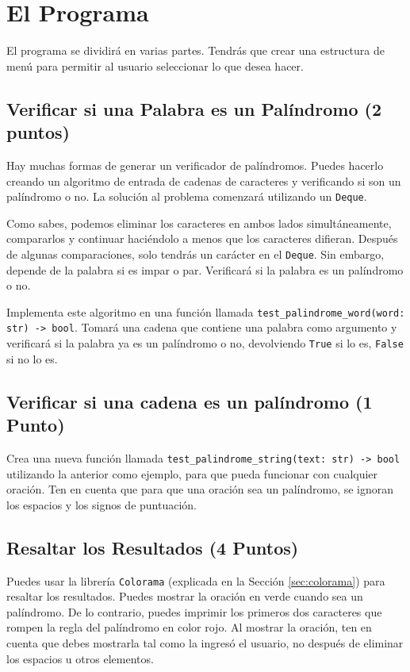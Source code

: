 \documentclass[10pt,a4paper]{article}
\begin{document}
\section{El Programa}

El programa se dividirá en varias partes. Tendrás que crear una estructura de menú para permitir al usuario seleccionar lo que desea hacer.


\subsection{Verificar si una Palabra es un Palíndromo (2 puntos)}

Hay muchas formas de generar un verificador de palíndromos. Puedes hacerlo creando un algoritmo de entrada de cadenas de caracteres y verificando si son un palíndromo o no. La solución al problema comenzará utilizando un \texttt{Deque}.

Como sabes, podemos eliminar los caracteres en ambos lados simultáneamente, compararlos y continuar haciéndolo a menos que los caracteres difieran. Después de algunas comparaciones, solo tendrás un carácter en el \texttt{Deque}. Sin embargo, depende de la palabra si es impar o par. Verificará si la palabra es un palíndromo o no.

Implementa este algoritmo en una función llamada \lstinline|test_palindrome_word(word: str) -> bool|. Tomará una cadena que contiene una palabra como argumento y verificará si la palabra ya es un palíndromo o no, devolviendo \lstinline|True| si lo es, \lstinline|False| si no lo es.

\subsection{Verificar si una cadena es un palíndromo (1 Punto)}
Crea una nueva función llamada \lstinline|test_palindrome_string(text: str) -> bool| utilizando la anterior como ejemplo, para que pueda funcionar con cualquier oración. Ten en cuenta que para que una oración sea un palíndromo, se ignoran los espacios y los signos de puntuación.

\subsection{Resaltar los Resultados (4 Puntos)}

Puedes usar la librería \texttt{Colorama} (explicada en la Sección \ref{sec:colorama}) para resaltar los resultados. Puedes mostrar la oración en verde cuando sea un palíndromo. De lo contrario, puedes imprimir los primeros dos caracteres que rompen la regla del palíndromo en color rojo. Al mostrar la oración, ten en cuenta que debes mostrarla tal como la ingresó el usuario, no después de eliminar los espacios u otros elementos.
\end{document}
